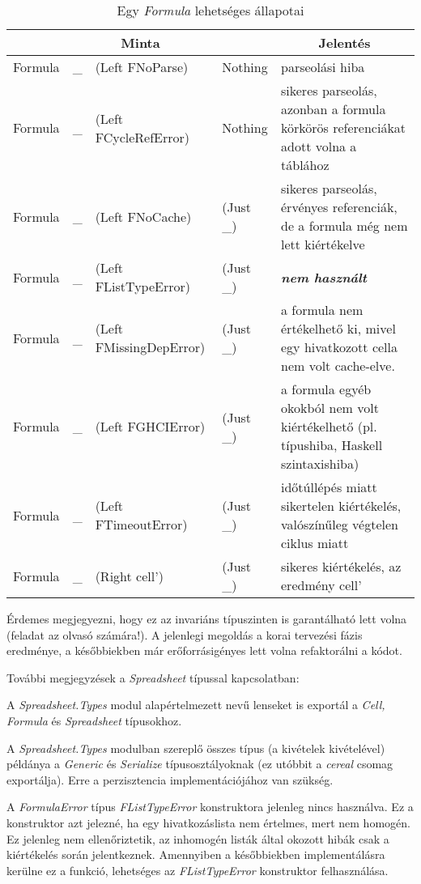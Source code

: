 \begin{table}
	\centering
	\begin{tabularx}{\textwidth}{ |l l l l| X |}
		\hline
		\multicolumn{4}{|c|}{Minta} & \multicolumn{1}{|c|}{Jelentés} \\
		\hline\hline
		Formula & \_ & (Left FNoParse) & Nothing & parseolási hiba \\
		\hline
		Formula & \_ & (Left FCycleRefError) & Nothing & sikeres parseolás, azonban a formula körkörös referenciákat adott volna a táblához \\
		\hline
		Formula & \_ & (Left FNoCache) & (Just \_) & sikeres parseolás, érvényes referenciák, de a formula még nem lett kiértékelve \\
		\hline
		Formula & \_ & (Left FListTypeError) & (Just \_) & \textbf{\textit{nem használt}} \\
		\hline
		Formula & \_ & (Left FMissingDepError) & (Just \_) & a formula nem értékelhető ki, mivel egy hivatkozott cella nem volt cache-elve. \\
		\hline
		Formula & \_ & (Left FGHCIError) & (Just \_) & a formula egyéb okokból nem volt kiértékelhető (pl. típushiba, Haskell szintaxishiba) \\
		\hline
		Formula & \_ & (Left FTimeoutError) & (Just \_) & időtúllépés miatt sikertelen kiértékelés, valószínűleg végtelen ciklus miatt \\
		\hline
		Formula & \_ & (Right cell') & (Just \_) & sikeres kiértékelés, az eredmény cell' \\
		\hline 
	\end{tabularx}
	\caption[Egy \textit{Formula} lehetséges állapotai]{Egy \textit{Formula} lehetséges állapotai}
	\label{tab:formula}
\end{table}

Érdemes megjegyezni, hogy ez az invariáns típuszinten is garantálható lett volna (feladat az olvasó számára!). A jelenlegi megoldás a korai tervezési fázis eredménye, a későbbiekben már erőforrásigényes lett volna refaktorálni a kódot.   

További megjegyzések a \textit{Spreadsheet} típussal kapcsolatban:
\begin{compactenum}
	\item A \textit{Spreadsheet.Types} modul alapértelmezett nevű lenseket is exportál a \textit{Cell, Formula} és \textit{Spreadsheet} típusokhoz.
	\item A \textit{Spreadsheet.Types} modulban szereplő összes típus (a kivételek kivételével) példánya a \textit{Generic} és \textit{Serialize} típusosztályoknak (ez utóbbit a \textit{cereal} csomag exportálja). Erre a perzisztencia implementációjához van szükség.
	\item A \textit{FormulaError} típus \textit{FListTypeError} konstruktora jelenleg nincs használva. Ez a konstruktor azt jelezné, ha egy hivatkozáslista nem értelmes, mert nem homogén. Ez jelenleg nem ellenőriztetik, az inhomogén listák által okozott hibák csak a kiértékelés során jelentkeznek. Amennyiben a későbbiekben implementálásra kerülne ez a funkció, lehetséges az \textit{FListTypeError} konstruktor felhasználása.
\end{compactenum} 

